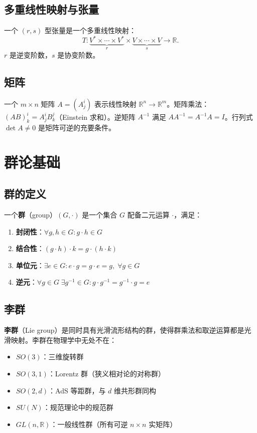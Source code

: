 \subsection{多重线性映射与张量}

一个 $(r,s)$ 型张量是一个多重线性映射：
\begin{equation}
    T: \underbrace{V^* \times \cdots \times V^*}_{r} \times \underbrace{V \times \cdots \times V}_{s} \to \mathbb{R}.
\end{equation}
$r$ 是逆变阶数，$s$ 是协变阶数。

\subsection{矩阵}

一个 $m \times n$ 矩阵 $A = (A^i_j)$ 表示线性映射 $\mathbb{R}^n \to \mathbb{R}^m$。矩阵乘法：$(AB)^i_k = A^i_j B^j_k$（Einstein 求和）。逆矩阵 $A^{-1}$ 满足 $A A^{-1} = A^{-1} A = I$。行列式 $\det A \neq 0$ 是矩阵可逆的充要条件。

\section{群论基础}

\subsection{群的定义}

一个\textbf{群}（group）$(G, \cdot)$ 是一个集合 $G$ 配备二元运算 $\cdot$，满足：
\begin{enumerate}
    \item \textbf{封闭性}：$\forall g, h \in G: g \cdot h \in G$
    \item \textbf{结合性}：$(g \cdot h) \cdot k = g \cdot (h \cdot k)$
    \item \textbf{单位元}：$\exists e \in G: e \cdot g = g \cdot e = g, \; \forall g \in G$
    \item \textbf{逆元}：$\forall g \in G \; \exists g^{-1} \in G: g \cdot g^{-1} = g^{-1} \cdot g = e$
\end{enumerate}

\subsection{李群}

\textbf{李群}（Lie group）是同时具有光滑流形结构的群，使得群乘法和取逆运算都是光滑映射。李群在物理学中无处不在：
\begin{itemize}
    \item $SO(3)$：三维旋转群
    \item $SO(3,1)$：Lorentz 群（狭义相对论的对称群）
    \item $SO(2,d)$：AdS 等距群，与 $d$ 维共形群同构
    \item $SU(N)$：规范理论中的规范群
    \item $GL(n,\mathbb{R})$：一般线性群（所有可逆 $n \times n$ 实矩阵）
\end{itemize}

